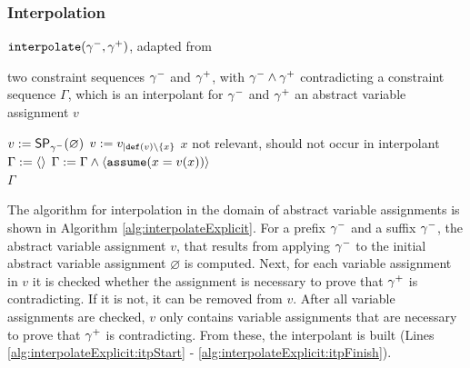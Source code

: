 \subsubsection*{Interpolation}
\begin{algorithm}[t]
\caption{$\texttt{interpolate}({\gamma^{-}}, {\gamma^{+}})$, adapted from \cite{Beyer2013}}
\label{alg:interpolateExplicit}
\begin{algorithmic}[1]
\Input two constraint sequences ${\gamma^{-}}$ and ${\gamma^{+}}$, with ${\gamma^{-}} \wedge {\gamma^{+}}$ contradicting
\Output a constraint sequence $\Gamma$, which is an interpolant for ${\gamma^{-}}$ and ${\gamma^{+}}$
\Variables an abstract variable assignment $v$

\State $v := \operatorname{\operatorname{\operatorname{\mathsf{SP}}}}_{\gamma^{-}}(\varnothing)$
		\State $v := v_{|\texttt{def}(v) \setminus \{x\}}$ \Comment $x$ not relevant, should not occur in interpolant
	\EndIf
\EndFor
\State $\Gamma := \langle \rangle$
 \label{alg:interpolateExplicit:itpStart}
	\State $\Gamma := \Gamma \wedge \langle \texttt{assume}(x = v(x))\rangle$
\EndFor\\ \label{alg:interpolateExplicit:itpFinish}
\Return $\Gamma$
\end{algorithmic}
\end{algorithm}

The algorithm for interpolation in the domain of abstract variable assignments is shown in Algorithm \ref{alg:interpolateExplicit}.
For a prefix ${\gamma^{-}}$ and a suffix ${\gamma^{-}}$, the abstract variable assignment $v$, that results from applying ${\gamma^{-}}$ to the initial abstract variable assignment $\varnothing$ is computed.
Next, for each variable assignment in $v$ it is checked whether the assignment is necessary to prove that ${\gamma^{+}}$ is contradicting.
If it is not, it can be removed from $v$.
After all variable assignments are checked, $v$ only contains variable assignments that are necessary to prove that ${\gamma^{+}}$ is contradicting.
From these, the interpolant is built (Lines \ref{alg:interpolateExplicit:itpStart} - \ref{alg:interpolateExplicit:itpFinish}).

